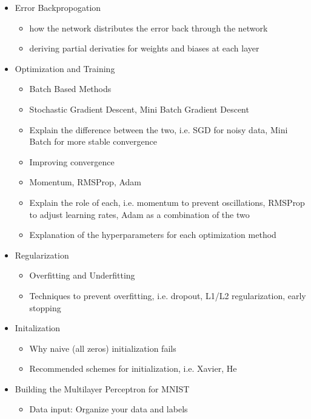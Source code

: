 \documentclass[9pt]{extarticle}
\theoremstyle{plain}
\theoremstyle{definition}
\theoremstyle{remark}
\begin{document}
\begin{itemize}
    \item Error Backpropogation
          \begin{itemize}
              \item how the network distributes the error back through the network
              \item deriving partial derivaties for weights and biases at each layer
          \end{itemize}
    \item Optimization and Training
          \begin{itemize}
              \item Batch Based Methods
              \item Stochastic Gradient Descent, Mini Batch Gradient Descent
              \item Explain the difference between the two, i.e. SGD for noisy data, Mini Batch for more stable convergence
              \item Improving convergence
              \item Momentum, RMSProp, Adam
              \item Explain the role of each, i.e. momentum to prevent oscillations, RMSProp to adjust learning rates, Adam as a combination of the two
              \item Explanation of the hyperparameters for each optimization method
          \end{itemize}
    \item Regularization
          \begin{itemize}
              \item Overfitting and Underfitting
              \item Techniques to prevent overfitting, i.e. dropout, L1/L2 regularization, early stopping
          \end{itemize}
    \item Initalization
          \begin{itemize}
              \item Why naive (all zeros) initialization fails
              \item Recommended schemes for initialization, i.e. Xavier, He
          \end{itemize}
    \item Building the Multilayer Perceptron for MNIST
          \begin{itemize}
              \item Data input: Organize your data and labels

\end{itemize}
\end{itemize}
\end{document}
